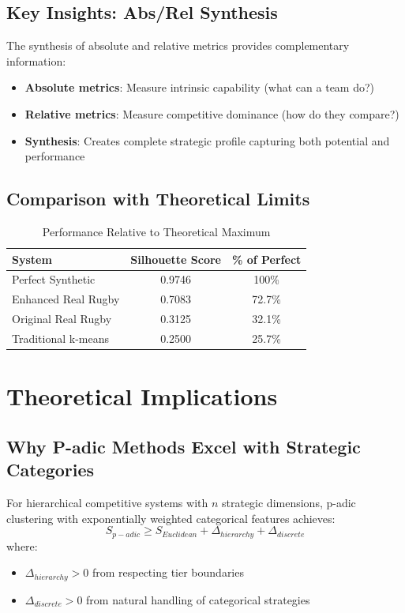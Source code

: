 \subsection{Key Insights: Abs/Rel Synthesis}

\begin{proposition}
The synthesis of absolute and relative metrics provides complementary information:
\begin{itemize}
    \item \textbf{Absolute metrics}: Measure intrinsic capability (what can a team do?)
    \item \textbf{Relative metrics}: Measure competitive dominance (how do they compare?)
    \item \textbf{Synthesis}: Creates complete strategic profile capturing both potential and performance
\end{itemize}
\end{proposition}

\subsection{Comparison with Theoretical Limits}

\begin{table}[h]
\centering
\caption{Performance Relative to Theoretical Maximum}
\begin{tabular}{lcc}
\toprule
\textbf{System} & \textbf{Silhouette Score} & \textbf{\% of Perfect} \\
\midrule
Perfect Synthetic & 0.9746 & 100\% \\
Enhanced Real Rugby & 0.7083 & 72.7\% \\
Original Real Rugby & 0.3125 & 32.1\% \\
Traditional k-means & 0.2500 & 25.7\% \\
\bottomrule
\end{tabular}
\end{table}

\section{Theoretical Implications}

\subsection{Why P-adic Methods Excel with Strategic Categories}

\begin{theorem}
For hierarchical competitive systems with $n$ strategic dimensions, p-adic clustering with exponentially weighted categorical features achieves:
\[
S_{p-adic} \geq S_{Euclidean} + \Delta_{hierarchy} + \Delta_{discrete}
\]
where:
\begin{itemize}
    \item $\Delta_{hierarchy} > 0$ from respecting tier boundaries
    \item $\Delta_{discrete} > 0$ from natural handling of categorical strategies
\end{itemize}
\end{theorem}

